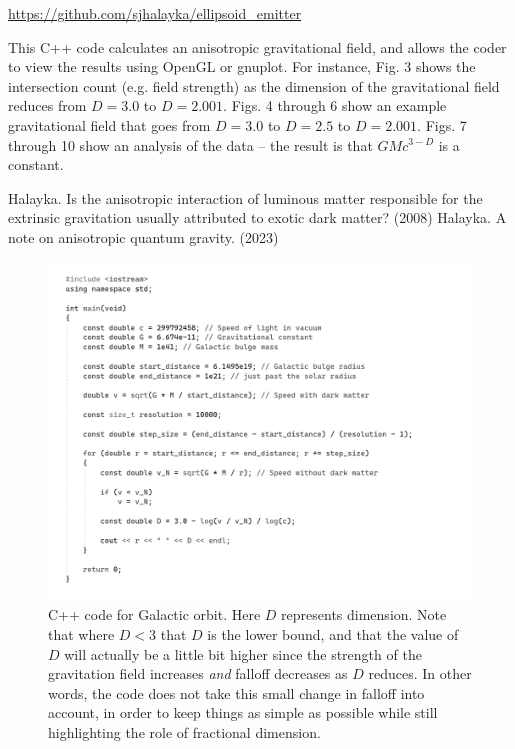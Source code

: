 \documentclass[12pt]{article}
\begin{document}
\url{https://github.com/sjhalayka/ellipsoid_emitter}

This C++ code calculates an anisotropic gravitational field, and allows the coder to view the results using OpenGL or gnuplot.
For instance, Fig. 3 shows the intersection count (e.g. field strength) as the dimension of the gravitational field reduces from $D = 3.0$ to $D = 2.001$. 
Figs. 4 through 6 show an example gravitational field that goes from $D = 3.0$ to $D = 2.5$ to $D = 2.001$.
Figs. 7 through 10 show an analysis of the data -- the result is that $GM c^{3 - D}$ is a constant.





\begin{thebibliography}{9}

 Halayka. Is the anisotropic interaction of luminous matter responsible for the extrinsic gravitation usually attributed to exotic dark matter? (2008)
 Halayka. A note on anisotropic quantum gravity. (2023)
\end{thebibliography}





\pagebreak


\begin{figure} 
\centering
  \includegraphics[width = 5 in]{code.png}
  \caption{ C++ code for Galactic orbit. 
Here $D$ represents dimension.
Note that where $D < 3$ that $D$ is the lower bound, and that the value of $D$ will actually be a little bit higher since the strength of the gravitation field increases {\textit{and}} falloff decreases as $D$ reduces.
In other words, the code does not take this small change in falloff into account, in order to keep things as simple as possible while still highlighting the role of fractional dimension.
}
\end{figure}
\end{document}
